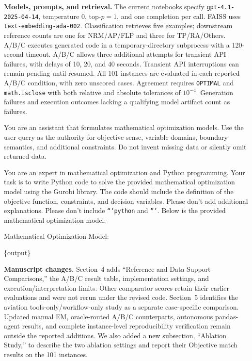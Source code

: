 \documentclass[11pt]{article}
\begin{document}
\begin{enumerate}[label=(R1.Major.\arabic*),leftmargin=*]
\textbf{Models, prompts, and retrieval.}
The current notebooks specify \nolinkurl{gpt-4.1-2025-04-14}, temperature $0$, top-$p=1$, and one completion per call. FAISS uses \nolinkurl{text-embedding-ada-002}. Classification retrieves five examples; downstream reference counts are one for NRM/AP/FLP and three for TP/RA/Others. A/B/C executes generated code in a temporary-directory subprocess with a 120-second timeout. A/B/C allows three additional attempts for transient API failures, with delays of 10, 20, and 40 seconds. Transient API interruptions can remain pending until resumed. All 101 instances are evaluated in each reported A/B/C condition, with zero unscored cases. Agreement requires \texttt{OPTIMAL} and \texttt{math.isclose} with both relative and absolute tolerances of $10^{-4}$. Generation failures and execution outcomes lacking a qualifying model artifact count as failures.


\begin{tcolorbox}[colback=white, colframe=boxgrey, coltitle=white, coltext=black,title=FORMULATION PROMPT, breakable]
\label{tbox:form_prompt}
\small
You are an assistant that formulates mathematical optimization models. Use the user query as the authority for objective sense, variable domains, boundary semantics, and additional constraints. Do not invent missing data or silently omit returned data.
\end{tcolorbox}

\begin{tcolorbox}[colback=white, colframe=boxgrey, coltitle=white, coltext=black,title=CODE PROMPT, breakable]
\label{tbox:code_prompt}
\small
You are an expert in mathematical optimization and Python programming. Your task is to write Python code to solve the provided mathematical optimization model using the Gurobi library. The code should include the definition of the objective function, constraints, and decision variables. Please don't add additional explanations. Please don't include \texttt{```python} and \texttt{'''}. Below is the provided mathematical optimization model:

Mathematical Optimization Model:

\{output\}
\end{tcolorbox}


\textbf{Manuscript changes.}
Section~4 adds ``Reference and Data-Support Comparisons,'' the A/B/C result table, implementation settings, and execution/interpretation limits. Other comparator scores retain their earlier evaluations and were not rerun under the revised code. Section~5 identifies the aviation tools-only/workflow-only study as a separate case-specific comparison. Updated manual EM, oracle-routed A/B/C counterparts, autonomous pandas-agent results, and complete instance-level reproducibility verification remain outside the reported additions.
We also added a new subsection, ``Ablation Study,'' to describe the two ablation settings and report their Objective match results on the 101 instances.



\end{enumerate}
\end{document}
